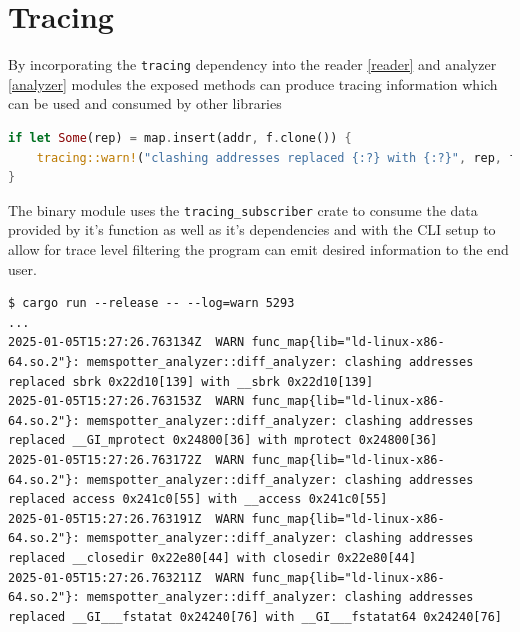 \section{Tracing}

By incorporating the \verb|tracing| \cite{tokio-rs_team_tokio-rstracing_2024} dependency into the reader \ref{reader} and analyzer \ref{analyzer} modules the exposed methods can produce tracing information which can be used and consumed by other libraries

\begin{lstlisting}[language=Rust, caption="Code fragment showcasing conditionally emiting a warning"]
if let Some(rep) = map.insert(addr, f.clone()) {
    tracing::warn!("clashing addresses replaced {:?} with {:?}", rep, f);
}
\end{lstlisting}

The binary module uses the \verb|tracing_subscriber| \cite{tokio-rs_team_tokiotracingtracing-subscriber_2024} crate to consume the data provided by it's function as well as it's dependencies and with the CLI setup to allow for trace level filtering the program can emit desired information to the end user.

\begin{lstlisting}[breaklines=true, caption="Fraction of the warnings emitted by the program with the log setting at warning level"]
$ cargo run --release -- --log=warn 5293
...
2025-01-05T15:27:26.763134Z  WARN func_map{lib="ld-linux-x86-64.so.2"}: memspotter_analyzer::diff_analyzer: clashing addresses replaced sbrk 0x22d10[139] with __sbrk 0x22d10[139]
2025-01-05T15:27:26.763153Z  WARN func_map{lib="ld-linux-x86-64.so.2"}: memspotter_analyzer::diff_analyzer: clashing addresses replaced __GI_mprotect 0x24800[36] with mprotect 0x24800[36]
2025-01-05T15:27:26.763172Z  WARN func_map{lib="ld-linux-x86-64.so.2"}: memspotter_analyzer::diff_analyzer: clashing addresses replaced access 0x241c0[55] with __access 0x241c0[55]
2025-01-05T15:27:26.763191Z  WARN func_map{lib="ld-linux-x86-64.so.2"}: memspotter_analyzer::diff_analyzer: clashing addresses replaced __closedir 0x22e80[44] with closedir 0x22e80[44]
2025-01-05T15:27:26.763211Z  WARN func_map{lib="ld-linux-x86-64.so.2"}: memspotter_analyzer::diff_analyzer: clashing addresses replaced __GI___fstatat 0x24240[76] with __GI___fstatat64 0x24240[76]
\end{lstlisting}